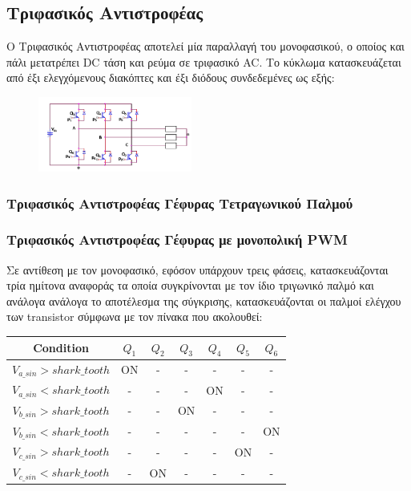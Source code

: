 \subsection{Τριφασικός Αντιστροφέας}
\noindent
Ο Τριφασικός Αντιστροφέας αποτελεί μία παραλλαγή του μονοφασικού, ο οποίος και πάλι μετατρέπει DC τάση και ρεύμα σε τριφασικό AC. Το κύκλωμα κατασκευάζεται από έξι ελεγχόμενους διακόπτες και έξι διόδους συνδεδεμένες ως εξής:
\begin{figure}[H]
	\centering
	\includegraphics[width=0.45\textwidth]{Images/circuit2.png}
	\label{circuit_2}
\end{figure}

\subsubsection{Τριφασικός Αντιστροφέας Γέφυρας Τετραγωνικού Παλμού}
\subsubsection{Τριφασικός Αντιστροφέας Γέφυρας με μονοπολική PWM}
\label{Three_PWM}
Σε αντίθεση με τον μονοφασικό, εφόσον υπάρχουν τρεις φάσεις, κατασκευάζονται τρία ημίτονα αναφοράς τα οποία συγκρίνονται με τον ίδιο τριγωνικό παλμό και ανάλογα ανάλογα το αποτέλεσμα της σύγκρισης, κατασκευάζονται οι παλμοί ελέγχου των transistor σύμφωνα με τον πίνακα που ακολουθεί:

\begin{table}[h]
	\centering
	\begin{tabular}{c|cccccc}
		Condition                 		  & $Q_1$ & $Q_2$ & $Q_3$ & $Q_4$ & $Q_5$ & $Q_6$ \\ \hline
		$V_{a\_sin} > shark\_tooth$ & ON    & -     & -     & -     & -     & -     \\
		$V_{a\_sin} < shark\_tooth$ & -     & -     & -     & ON    & -     & -     \\
		$V_{b\_sin} > shark\_tooth$ & -     & -     & ON    & -     & -     & -     \\
		$V_{b\_sin} < shark\_tooth$ & -     & -     & -     & -     & -     & ON    \\
		$V_{c\_sin} > shark\_tooth$ & -     & -     & -     & -     & ON    & -     \\
		$V_{c\_sin} < shark\_tooth$ & -     & ON    & -     & -     & -     & -    
	\end{tabular}
\end{table}